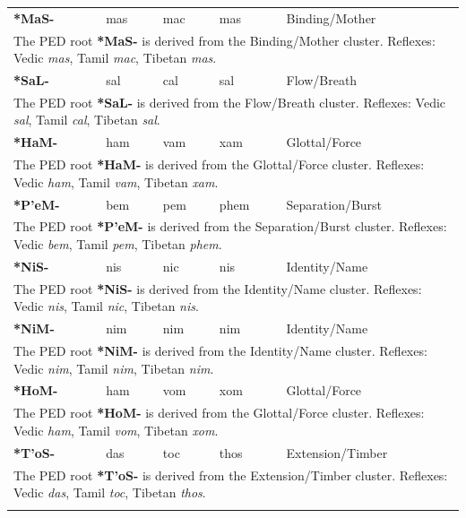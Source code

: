\begin{longtable}{p{} p{} p{} p{} p{}}
\textbf{*MaS-} & mas & mac & mas & Binding/Mother \\ 
\multicolumn{5}{p{\textwidth}}{\small The PED root \textbf{*MaS-} is derived from the Binding/Mother cluster. Reflexes: Vedic \textit{mas}, Tamil \textit{mac}, Tibetan \textit{mas}. } \\ \addlinespace 
\textbf{*SaL-} & sal & cal & sal & Flow/Breath \\ 
\multicolumn{5}{p{\textwidth}}{\small The PED root \textbf{*SaL-} is derived from the Flow/Breath cluster. Reflexes: Vedic \textit{sal}, Tamil \textit{cal}, Tibetan \textit{sal}. } \\ \addlinespace 
\textbf{*HaM-} & ham & vam & xam & Glottal/Force \\ 
\multicolumn{5}{p{\textwidth}}{\small The PED root \textbf{*HaM-} is derived from the Glottal/Force cluster. Reflexes: Vedic \textit{ham}, Tamil \textit{vam}, Tibetan \textit{xam}. } \\ \addlinespace 
\textbf{*P'eM-} & bem & pem & phem & Separation/Burst \\ 
\multicolumn{5}{p{\textwidth}}{\small The PED root \textbf{*P'eM-} is derived from the Separation/Burst cluster. Reflexes: Vedic \textit{bem}, Tamil \textit{pem}, Tibetan \textit{phem}. } \\ \addlinespace 
\textbf{*NiS-} & nis & nic & nis & Identity/Name \\ 
\multicolumn{5}{p{\textwidth}}{\small The PED root \textbf{*NiS-} is derived from the Identity/Name cluster. Reflexes: Vedic \textit{nis}, Tamil \textit{nic}, Tibetan \textit{nis}. } \\ \addlinespace 
\textbf{*NiM-} & nim & nim & nim & Identity/Name \\ 
\multicolumn{5}{p{\textwidth}}{\small The PED root \textbf{*NiM-} is derived from the Identity/Name cluster. Reflexes: Vedic \textit{nim}, Tamil \textit{nim}, Tibetan \textit{nim}. } \\ \addlinespace 
\textbf{*HoM-} & ham & vom & xom & Glottal/Force \\ 
\multicolumn{5}{p{\textwidth}}{\small The PED root \textbf{*HoM-} is derived from the Glottal/Force cluster. Reflexes: Vedic \textit{ham}, Tamil \textit{vom}, Tibetan \textit{xom}. } \\ \addlinespace 
\textbf{*T'oS-} & das & toc & thos & Extension/Timber \\ 
\multicolumn{5}{p{\textwidth}}{\small The PED root \textbf{*T'oS-} is derived from the Extension/Timber cluster. Reflexes: Vedic \textit{das}, Tamil \textit{toc}, Tibetan \textit{thos}. } \\ \addlinespace 

\end{longtable}
